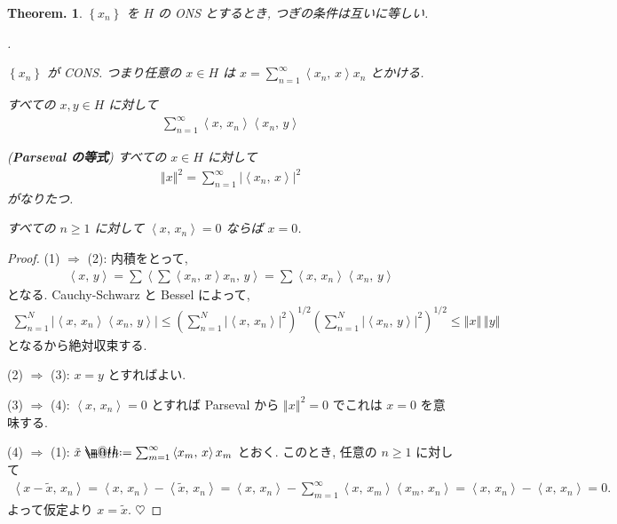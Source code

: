\documentclass[openany, a4paper, oneside]{book}
\makeatletter
\newcounter{enum2}
\renewenvironment{enumerate}{%
\begin{list}%
{%
\arabic{enum2}.\ \,%
}%
{%
\usecounter{enum2}
\setlength{\itemindent}{0pt}%
\setlength{\leftmargin}{6pt}%
\setlength{\rightmargin}{0pt}%
\setlength{\labelsep}{0pt}%
\setlength{\labelwidth}{6pt}%
\setlength{\itemsep}{0pt}%
\setlength{\parsep}{0pt}%
\setlength{\listparindent}{0pt}%
}
}{%
\end{list}%
}
\newcommand*{\defeq}{\mathrel{\rlap{%
\raisebox{0.3ex}{$\m@th\cdot$}}%
\raisebox{-0.3ex}{$\m@th\cdot$}}%
=}
\theoremstyle{break}
\newtheorem{thm}{Theorem.}[section]
\theoremstyle{breakdefn}
\newcommand{\abs}[1]{\left|#1\right|}
\newcommand{\norm}[1]{\left\Vert#1\right\Vert}
\newcommand{\rbk}[1]{\left (#1\right)}
\newcommand{\cbk}[1]{\left\{#1\right\}}
\newcommand{\bkt}[2]{\left\langle#1,\,#2\right\rangle}
\newcommand{\upbf}[1]{\textup{\textbf{#1}}}
\makeatother
\begin{document}
\begin{thm}\label{functional_analysis_hilbert_space_yukimi_8}
 $\cbk{x_n}$ を $H$ の ONS とするとき, つぎの条件は互いに等しい.
\begin{enumerate}
\item $\cbk{x_n}$ が CONS.
    つまり任意の $x \in H$ は $x = \sum_{n=1}^\infty \bkt{x_n}{x} x_n$ とかける.
\item すべての $x, y \in H$ に対して
   \begin{align}
    \sum_{n=1}^\infty \bkt{x}{x_n} \bkt{x_n}{y} \label{functional_analysis_hilbert_space_yukimi_9}
   \end{align}
\item (\upbf{Parseval の等式}) すべての $x \in H$ に対して
   \begin{align}
    \norm{x}^2
    =
    \sum_{n = 1}^\infty \abs{\bkt{x_n}{x}}^2
   \end{align}
    がなりたつ.
\item すべての $n \geq 1$ に対して $\bkt{x}{x_n} = 0$ ならば $x = 0$.
\end{enumerate}
\end{thm}
\begin{proof}
(1) $\Rightarrow$ (2):
内積をとって,
\begin{align}
 \bkt{x}{y}
 =
 \sum \bkt{\sum \bkt{x_n}{x} x_n}{y}
 =
 \sum \bkt{x}{x_n} \bkt{x_n}{y}
\end{align}
となる.
Cauchy-Schwarz と Bessel によって,
\begin{align}
 \sum_{n=1}^N \abs{\bkt{x}{x_n} \bkt{x_n}{y}}
 \leq
 \rbk{\sum_{n=1}^N \abs{\bkt{x}{x_n}}^2}^{1/2}
  \rbk{\sum_{n=1}^N \abs{\bkt{x_n}{y}}^2}^{1/2}
 \leq
 \norm{x} \, \norm{y}
\end{align}
となるから絶対収束する.

(2) $\Rightarrow$ (3):
$x = y$ とすればよい.

(3) $\Rightarrow$ (4):
$\bkt{x}{x_n} = 0$ とすれば Parseval から $\norm{x}^2 = 0$ でこれは $x = 0$ を意味する.

(4) $\Rightarrow$ (1):
$\tilde{x} \defeq \sum_{m = 1}^\infty \bkt{x_m}{x} x_m$ とおく.
このとき, 任意の $n \geq 1$ に対して
\begin{align}
 \bkt{x - \tilde{x}}{x_n}
 =
 \bkt{x}{x_n} - \bkt{\tilde{x}}{x_n}
 =
 \bkt{x}{x_n} - \sum_{m=1}^{\infty} \bkt{x}{x_m} \bkt{x_m}{x_n}
 =
 \bkt{x}{x_n} - \bkt{x}{x_n}
 = 0.
\end{align}
よって仮定より $x = \tilde{x}$.
$\heartsuit$
\end{proof}
\end{document}

